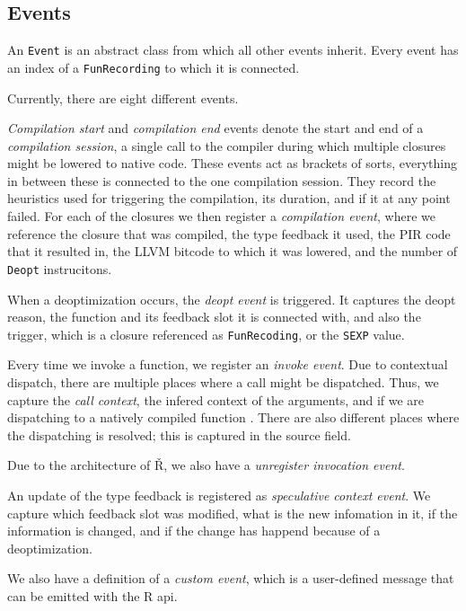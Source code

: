 \subsection{Events}

An \texttt{Event} is an abstract class from which all other events inherit. Every event has an index of a \texttt{FunRecording} to which it is connected.

Currently, there are eight different events.

\textit{Compilation start} and \textit{compilation end} events denote the start and end of a \textit{compilation session}, a single call to the compiler during which multiple closures might be lowered to native code. These events act as brackets of sorts, everything in between these is connected to the one compilation session. They record the heuristics used for triggering the compilation, its duration, and if it at any point failed. For each of the closures we then register a \textit{compilation event}, where we reference the closure that was compiled, the type feedback it used, the PIR code that it resulted in, the LLVM bitcode to which it was lowered, and the number of \texttt{Deopt} instrucitons.

When a deoptimization occurs, the \textit{deopt event} is triggered. It captures the deopt reason, the function and its feedback slot it is connected with, and also the trigger, which is a closure referenced as \texttt{FunRecoding}, or the \texttt{SEXP} value.

Every time we invoke a function, we register an \textit{invoke event}. Due to contextual dispatch, there are multiple places where a call might be dispatched. Thus, we capture the \textit{call context}, the infered context of the arguments, and if we are dispatching to a natively compiled function . There are also different places where the dispatching is resolved; this is captured in the source field.

Due to the architecture of Ř, we also have a \textit{unregister invocation event}. \todoadd

An update of the type feedback is registered as \textit{speculative context event}. We capture which feedback slot was modified, what is the new infomation in it, if the information is changed, and if the change has happend because of a deoptimization.

We also have a definition of a \textit{custom event}, which is a user-defined message that can be emitted with the R api.

